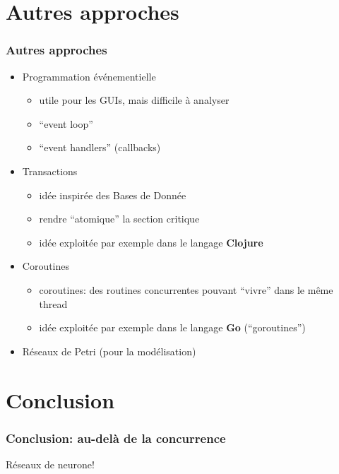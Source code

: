 \documentclass{beamer}
\begin{document}
\section{Autres approches}
\begin{frame}
  \frametitle{Autres approches}
  \begin{itemize}
  \item{Programmation événementielle} 
  \begin{itemize}
  \item utile pour les GUIs, mais difficile à analyser
  \item ``event loop''
  \item ``event handlers'' (callbacks)
  \end{itemize}
  
  \item{Transactions }
  \begin{itemize}
  \item idée inspirée des Bases de Donnée
  \item rendre ``atomique'' la section critique
  \item idée exploitée par exemple dans le langage \textbf{Clojure}
  \end{itemize}
  
  \item{Coroutines}
  \begin{itemize}
  \item coroutines: des routines concurrentes pouvant ``vivre'' dans le même thread
  \item idée exploitée par exemple dans le langage \textbf{Go} (``goroutines'')
  \end{itemize}

  \item{Réseaux de Petri} (pour la modélisation)
  \end{itemize}
\end{frame}

\section{Conclusion}
\begin{frame}
  \frametitle{Conclusion: au-delà de la concurrence}
  Réseaux de neurone!
\end{frame}
\end{document}
